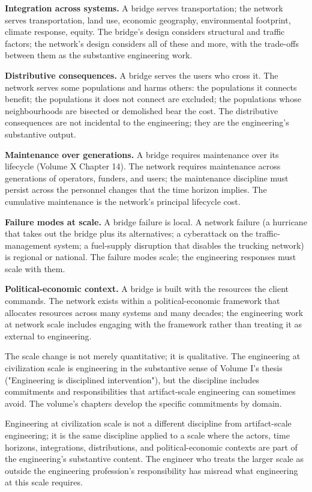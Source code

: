 \textbf{Integration across systems.} A bridge serves transportation; the network serves transportation, land use, economic geography, environmental footprint, climate response, equity. The bridge's design considers structural and traffic factors; the network's design considers all of these and more, with the trade-offs between them as the substantive engineering work.

\textbf{Distributive consequences.} A bridge serves the users who cross it. The network serves some populations and harms others: the populations it connects benefit; the populations it does not connect are excluded; the populations whose neighbourhoods are bisected or demolished bear the cost. The distributive consequences are not incidental to the engineering; they are the engineering's substantive output.

\textbf{Maintenance over generations.} A bridge requires maintenance over its lifecycle (Volume X Chapter 14). The network requires maintenance across generations of operators, funders, and users; the maintenance discipline must persist across the personnel changes that the time horizon implies. The cumulative maintenance is the network's principal lifecycle cost.

\textbf{Failure modes at scale.} A bridge failure is local. A network failure (a hurricane that takes out the bridge plus its alternatives; a cyberattack on the traffic-management system; a fuel-supply disruption that disables the trucking network) is regional or national. The failure modes scale; the engineering responses must scale with them.

\textbf{Political-economic context.} A bridge is built with the resources the client commands. The network exists within a political-economic framework that allocates resources across many systems and many decades; the engineering work at network scale includes engaging with the framework rather than treating it as external to engineering.

The scale change is not merely quantitative; it is qualitative. The engineering at civilization scale is engineering in the substantive sense of Volume I's thesis ("Engineering is disciplined intervention"), but the discipline includes commitments and responsibilities that artifact-scale engineering can sometimes avoid. The volume's chapters develop the specific commitments by domain.

\begin{principle}
Engineering at civilization scale is not a different discipline from artifact-scale engineering; it is the same discipline applied to a scale where the actors, time horizons, integrations, distributions, and political-economic contexts are part of the engineering's substantive content. The engineer who treats the larger scale as outside the engineering profession's responsibility has misread what engineering at this scale requires.
\end{principle}


